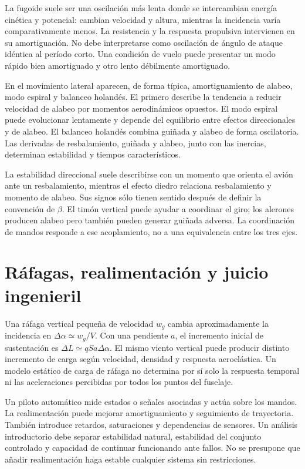 La fugoide suele ser una oscilación más lenta donde se intercambian energía cinética y potencial: cambian velocidad y altura, mientras la incidencia varía comparativamente menos. La resistencia y la respuesta propulsiva intervienen en su amortiguación. No debe interpretarse como oscilación de ángulo de ataque idéntica al período corto. Una condición de vuelo puede presentar un modo rápido bien amortiguado y otro lento débilmente amortiguado.

En el movimiento lateral aparecen, de forma típica, amortiguamiento de alabeo, modo espiral y balanceo holandés. El primero describe la tendencia a reducir velocidad de alabeo por momentos aerodinámicos opuestos. El modo espiral puede evolucionar lentamente y depende del equilibrio entre efectos direccionales y de alabeo. El balanceo holandés combina guiñada y alabeo de forma oscilatoria. Las derivadas de resbalamiento, guiñada y alabeo, junto con las inercias, determinan estabilidad y tiempos característicos.

La estabilidad direccional suele describirse con un momento que orienta el avión ante un resbalamiento, mientras el efecto diedro relaciona resbalamiento y momento de alabeo. Sus signos sólo tienen sentido después de definir la convención de $\beta$. El timón vertical puede ayudar a coordinar el giro; los alerones producen alabeo pero también pueden generar guiñada adversa. La coordinación de mandos responde a ese acoplamiento, no a una equivalencia entre los tres ejes.

\section{Ráfagas, realimentación y juicio ingenieril}
Una ráfaga vertical pequeña de velocidad $w_g$ cambia aproximadamente la incidencia en $\Delta\alpha\simeq w_g/V$. Con una pendiente $a$, el incremento inicial de sustentación es $\Delta L\simeq qSa\Delta\alpha$. El mismo viento vertical puede producir distinto incremento de carga según velocidad, densidad y respuesta aeroelástica. Un modelo estático de carga de ráfaga no determina por sí solo la respuesta temporal ni las aceleraciones percibidas por todos los puntos del fuselaje.

Un piloto automático mide estados o señales asociadas y actúa sobre los mandos. La realimentación puede mejorar amortiguamiento y seguimiento de trayectoria. También introduce retardos, saturaciones y dependencias de sensores. Un análisis introductorio debe separar estabilidad natural, estabilidad del conjunto controlado y capacidad de continuar funcionando ante fallos. No se presupone que añadir realimentación haga estable cualquier sistema sin restricciones.

